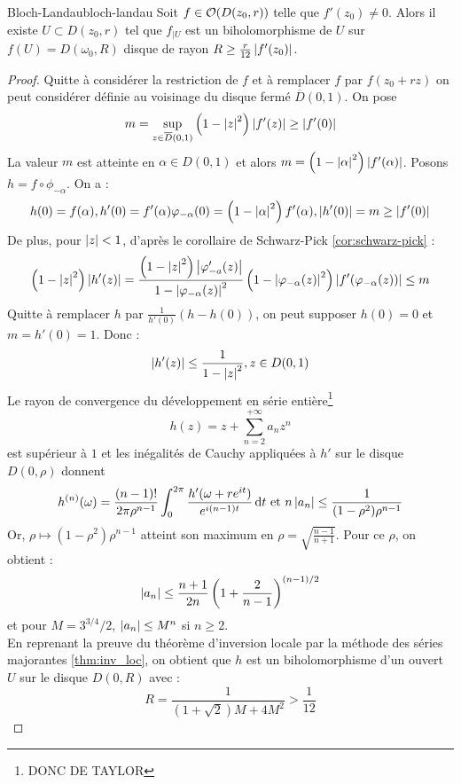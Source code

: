 \documentclass{cours}
\begin{document}
\begin{théorème}{Bloch-Landau}{bloch-landau}
    Soit $f \in \mathcal{O}(D(z_{0}, r))$ telle que $f'(z_{0}) \neq 0$. Alors il existe $U \subset D(z_{0}, r)$ tel que $f_{\mid U}$ est un biholomorphisme de $U$ sur $f(U) = D(\omega_{0}, R)$ disque de rayon $R \geq \frac{r}{12}\left|f'(z_{0})\right|$.
\end{théorème}
\begin{proof}
    Quitte à considérer la restriction de $f$ et à remplacer $f$ par $f(z_{0} + rz)$ on peut considérer définie au voisinage du disque fermé $\overline{D}(0, 1)$. On pose
    \[
        m = \sup_{z \in \overline{D}(0, 1)}\left(1 - \left|z\right|^{2}\right)\left|f'(z)\right| \geq \left|f'(0)\right|
    \]
    La valeur $m$ est atteinte en $\alpha \in D(0, 1)$ et alors $m = \left(1 - \left|\alpha\right|^{2}\right)\left|f'(\alpha)\right|$. Posons $h = f\circ\phi_{-\alpha}$. On a : 
    \[
        h(0) = f(\alpha), h'(0) = f'(\alpha)\varphi_{-\alpha}(0) = \left(1 - \left|\alpha\right|^{2}\right)f'(\alpha), \left|h'(0)\right| = m \geq \left|f'(0)\right|
    \]
    De plus, pour $\left|z\right| < 1$, d'après le corollaire de Schwarz-Pick \ref{cor:schwarz-pick} : 
    \[
        \left(1-\left|z\right|^{2}\right)\left|h'(z)\right| = \frac{\left(1 - \left|z\right|^{2}\right)\left|\varphi_{-a}'(z)\right|}{1 - \left|\varphi_{-\alpha}(z)\right|^{2}}\left(1 - \left|\varphi_{-\alpha}(z)\right|^{2}\right)\left|f'(\varphi_{-\alpha}(z))\right| \leq m
    \]
    Quitte à remplacer $h$ par $\frac{1}{h'(0)}(h-h(0))$, on peut supposer $h(0) = 0$ et $m = h'(0) = 1$. Donc : 
    \[
        \left|h'(z)\right| \leq \frac{1}{1 - \left|z\right|^{2}}, z \in D(0, 1)
    \]
    Le rayon de convergence du développement en série entière\footnote{DONC DE TAYLOR}
    \[
        h(z) = z + \sum_{n = 2}^{+ \infty}a_{n}z^{n}
    \]
    est supérieur à $1$ et les inégalités de Cauchy appliquées à $h'$ sur le disque $D(0, \rho)$ donnent 
    \[
        h^{(n)}(\omega) = \frac{(n- 1)!}{2\pi\rho^{n-1}}\int_{0}^{2\pi}\frac{h'(\omega + re^{it})}{e^{i(n - 1)t}}{\rm \, d} t \text{ et } n\left|a_{n}\right| \leq \frac{1}{(1 - \rho^{2})\rho^{n - 1}}
    \]
    Or, $\rho \mapsto (1 - \rho^{2})\rho^{n - 1}$ atteint son maximum en $\rho = \sqrt{\frac{n-1}{n + 1}}$. Pour ce $\rho$, on obtient : 
    \[
        \left|a_{n}\right| \leq \frac{n + 1}{2n}\left(1 + \frac{2}{n - 1}\right)^{(n-1)/2}
    \]
    et pour $M = 3^{3/4}/2$, $\left|a_{n}\right| \leq M^{n}$ si $n \geq 2$.\\
    En reprenant la preuve du théorème d'inversion locale par la méthode des séries majorantes \ref{thm:inv_loc}, on obtient que $h$ est un biholomorphisme d'un ouvert $U$ sur le disque $D(0, R)$ avec : 
    \[
      R = \frac{1}{\left(1 + \sqrt{2}\right)M + 4M^{2}}>\frac{1}{12}
    \]
\end{proof}
\end{document}
